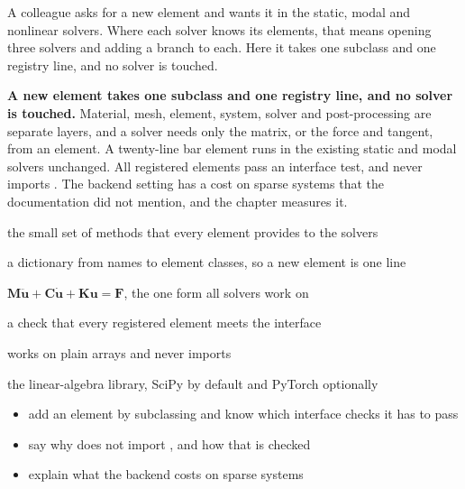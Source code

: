 \newpage\thispagestyle{hl}
\begin{hlquote}A colleague asks for a new element and wants it in the static, modal and nonlinear solvers. Where each solver knows its elements, that means opening three solvers and adding a branch to each. Here it takes one subclass and one registry line, and no solver is touched.\end{hlquote}
\vspace{8pt}\begin{hlsum}\textbf{A new element takes one subclass and one registry line, and no solver is touched.} Material, mesh, element, system, solver and post-processing are separate layers, and a solver needs only the matrix, or the force and tangent, from an element. A twenty-line bar element runs in the existing static and modal solvers unchanged. All \cdeRegTotal{} registered elements pass an interface test, and \rom{} never imports \fea{}. The  backend setting has a cost on sparse systems that the documentation did not mention, and the chapter measures it.\end{hlsum}
\begin{description}\setlength\itemsep{5pt}\setlength\parsep{0pt}\renewcommand{\descriptionlabel}[1]{\hspace{\labelsep}\sffamily\bfseries\color{hlnavy}#1}
\item[Element interface] the small set of methods that every element provides to the solvers
\item[Registry] a dictionary from names to element classes, so a new element is one line
\item[Semi-discrete equation] $\bm M\ddot{\bm u}+\bm C\dot{\bm u}+\bm K\bm u=\bm F$, the one form all solvers work on
\item[Conformance test] a check that every registered element meets the interface
\item[One-way dependence] \rom{} works on plain arrays and never imports \fea{}
\item[Backend] the linear-algebra library, SciPy by default and PyTorch optionally
\end{description}
\begin{itemize}\setlength\itemsep{3pt}
\item add an element by subclassing and know which interface checks it has to pass
\item say why \rom{} does not import \fea{}, and how that is checked
\item explain what the  backend costs on sparse systems
\end{itemize}
